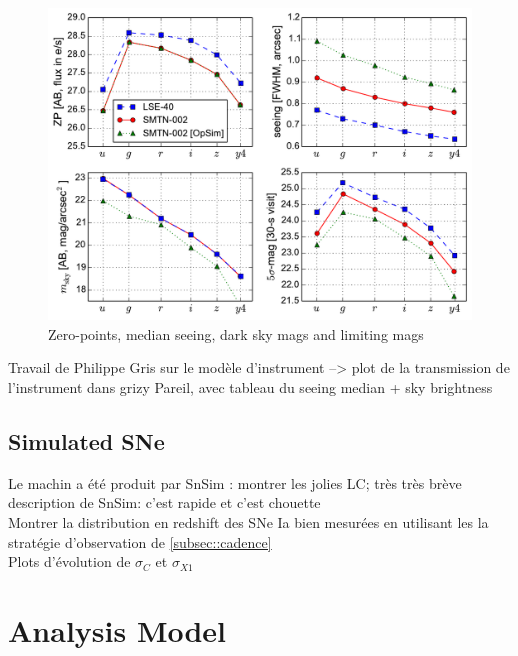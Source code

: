 \documentclass[\docopts]{\docclass}
\begin{document}
\begin{figure}[t]
\begin{center}
\includegraphics[width=\linewidth]{lsst_model_summary.pdf}
\caption{Zero-points, median seeing, dark sky mags and limiting mags}
\label{fig:zp}
\end{center}
\end{figure}


Travail de Philippe Gris sur le modèle d'instrument --> plot de la transmission de l'instrument dans grizy
Pareil, avec tableau du seeing median + sky brightness

\subsection{Simulated SNe}
\label{ssec::snsim}
Le machin a été produit par SnSim : montrer les jolies LC; très très brève description de SnSim: c'est rapide et c'est chouette \\
Montrer la distribution en redshift des SNe Ia bien mesurées en utilisant les la stratégie d'observation de \ref{subsec::cadence} \\
Plots d'évolution de $\sigma_C$ et $\sigma_{X1}$


\section{Analysis Model}
\label{sec::analysis_model}
\end{document}
